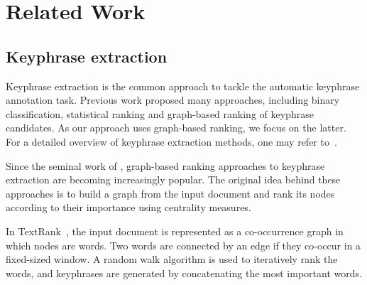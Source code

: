 \section{Related Work}
\label{sec:related_work}
  \subsection{Keyphrase extraction}
  \label{subsec:ake}
    Keyphrase extraction is the common approach to tackle the automatic
    keyphrase annotation task. Previous work proposed many approaches,
    including binary classification, statistical ranking and graph-based
    ranking of keyphrase candidates. As our approach uses graph-based
    ranking, we focus on the latter. For a detailed overview of
    keyphrase extraction methods, one may refer 
    to~\cite{hasan2014state_of_the_art}.

    
    Since the seminal work of , graph-based
    ranking approaches to keyphrase extraction are becoming increasingly popular.
    The %
    original idea behind these approaches is to build a graph from 
    the input document and rank its nodes according to their importance 
    using centrality measures.
    
    In TextRank~\cite{mihalcea2004textrank}, the input document is represented as
    a co-occurrence graph in which nodes are words.
    Two words are connected by an edge if they co-occur in a fixed-sized window.
    A random walk algorithm is used to iteratively rank the words, and keyphrases
    are generated by concatenating the most important words.
    
